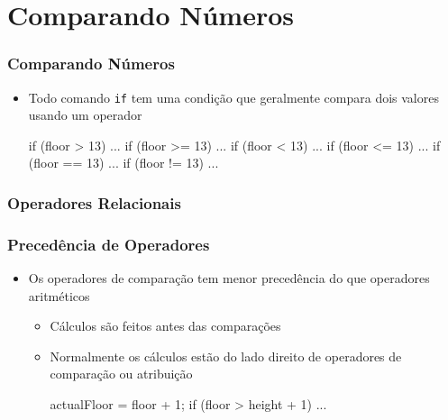 \documentclass[xcolor={dvipsnames,table},aspectratio=169]{beamer}
\begin{document}
\section{Comparando Números}

\begin{frame}[fragile]\frametitle{Comparando Números}
\begin{itemize}
	\item Todo comando \texttt{if} tem uma condição que geralmente compara dois valores usando um operador
\begin{javacode}
if (floor > 13) ...
if (floor >= 13) ...
if (floor < 13) ...
if (floor <= 13) ...
if (floor == 13) ...
if (floor != 13) ...
\end{javacode}
\end{itemize}
\end{frame}

\begin{frame}[fragile]\frametitle{Operadores Relacionais}
\begin{center}
\end{center}
\end{frame}

\begin{frame}[fragile]\frametitle{Precedência de Operadores}
\begin{itemize}
	\item Os operadores de comparação tem menor precedência do que operadores aritméticos
	\begin{itemize}
		\item Cálculos são feitos antes das comparações
		\item Normalmente os cálculos estão do lado direito de operadores de comparação ou atribuição
\begin{javacode}
actualFloor = floor + 1;
if (floor > height + 1) ...
\end{javacode}
	\end{itemize}
\end{itemize}
\end{frame}
\end{document}
